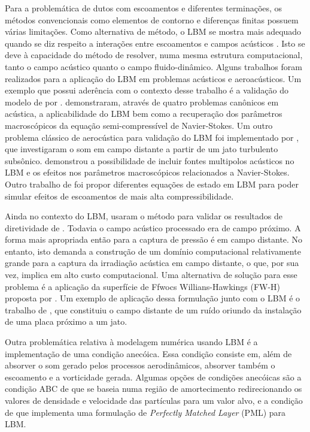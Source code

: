 Para a problemática de dutos com escoamentos e diferentes terminações, os métodos convencionais como elementos de contorno e diferenças finitas possuem várias limitações. Como alternativa de método, o LBM se mostra mais adequado quando se diz respeito a interações entre escoamentos e campos acústicos \cite{shi2013lattice}. Isto se deve à capacidade do método de resolver, numa mesma estrutura computacional, tanto o campo acústico quanto o campo fluido-dinâmico. Alguns trabalhos foram realizados para a aplicação do LBM em problemas acústicos e aeroacústicos. Um exemplo que possui aderência com o contexto desse trabalho é a validação do modelo de  por .  demonstraram, através de quatro problemas canônicos em acústica, a aplicabilidade do LBM bem como a recuperação dos parâmetros macroscópicos da equação semi-compressível de Navier-Stokes. Um outro problema clássico de aerocústica para validação do LBM foi implementado por , que investigaram o som em campo distante a partir de um jato turbulento subsônico.  demonstrou a possibilidade de incluir fontes multipolos acústicos no LBM e os efeitos nos parâmetros macroscópicos relacionados a Navier-Stokes. Outro trabalho de  foi propor diferentes equações de estado em LBM para poder simular efeitos de escoamentos de mais alta compressibilidade. 

Ainda no contexto do LBM,  usaram o método para validar os resultados de diretividade de . Todavia o campo acústico processado era de campo próximo. A forma mais apropriada então para a captura de pressão é em campo distante. No entanto, isto demanda a construção de um domínio computacional relativamente grande para a captura da irradiação acústica em campo distante, o que, por sua vez, implica em alto custo computacional. Uma alternativa de solução para esse problema é a aplicação da superfície de Ffwocs Willians-Hawkings (FW-H) proposta por . Um exemplo de aplicação dessa formulação junto com o LBM é o trabalho de , que constituiu o campo distante de um ruído oriundo da instalação de uma placa próximo a um jato.

Outra problemática relativa à modelagem numérica usando LBM é a implementação de uma condição anecóica. Essa condição consiste em, além de absorver o som gerado pelos processos aerodinâmicos, absorver também o escoamento e a vorticidade gerada. Algumas opções de condições anecóicas são a condição ABC de  que se baseia numa região de amortecimento redirecionando os valores de densidade e velocidade das partículas para um valor alvo, e a condição de  que implementa uma formulação de \textit{Perfectly Matched Layer} (PML) para LBM.

